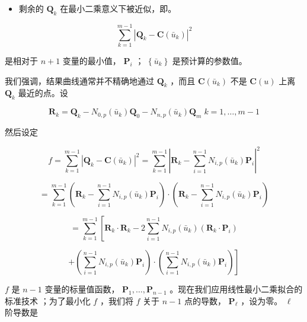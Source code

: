 \documentclass[../main.tex]{subfiles}
\begin{document}
\begin{itemize}
\item 剩余的 \({\mathbf{Q}}_{k}\) 在最小二乘意义下被近似，即。
\end{itemize}

\[
\mathop{\sum }\limits_{{k = 1}}^{{m - 1}}{\left| {\mathbf{Q}}_{k} - \mathbf{C}\left( {\bar{u}}_{k}\right) \right| }^{2} \tag{9.62}
\]

是相对于 \(n + 1\) 变量的最小值， \({\mathbf{P}}_{i}\) ； \(\left\{  {\bar{u}}_{k}\right\}\) 是预计算的参数值。

我们强调，结果曲线通常并不精确地通过 \({\mathbf{Q}}_{k}\) ，而且 \(\mathbf{C}\left( {\bar{u}}_{k}\right)\) 不是 \(\mathbf{C}\left( u\right)\) 上离 \({\mathbf{Q}}_{k}\) 最近的点。设

\[
{\mathbf{R}}_{k} = {\mathbf{Q}}_{k} - {N}_{0,p}\left( {\bar{u}}_{k}\right) {\mathbf{Q}}_{0} - {N}_{n,p}\left( {\bar{u}}_{k}\right) {\mathbf{Q}}_{m}\;k = 1,\ldots ,m - 1 \tag{9.63}
\]

然后设定

\[
f = \mathop{\sum }\limits_{{k = 1}}^{{m - 1}}{\left| {\mathbf{Q}}_{k} - \mathbf{C}\left( {\bar{u}}_{k}\right) \right| }^{2} = \mathop{\sum }\limits_{{k = 1}}^{{m - 1}}{\left| {\mathbf{R}}_{k} - \mathop{\sum }\limits_{{i = 1}}^{{n - 1}}{N}_{i,p}\left( {\bar{u}}_{k}\right) {\mathbf{P}}_{i}\right| }^{2}
\]

\[
= \mathop{\sum }\limits_{{k = 1}}^{{m - 1}}\left( {{\mathbf{R}}_{k} - \mathop{\sum }\limits_{{i = 1}}^{{n - 1}}{N}_{i,p}\left( {\bar{u}}_{k}\right) {\mathbf{P}}_{i}}\right)  \cdot  \left( {{\mathbf{R}}_{k} - \mathop{\sum }\limits_{{i = 1}}^{{n - 1}}{N}_{i,p}\left( {\bar{u}}_{k}\right) {\mathbf{P}}_{i}}\right)
\]

\[
= \mathop{\sum }\limits_{{k = 1}}^{{m - 1}}\left\lbrack  {{\mathbf{R}}_{k} \cdot  {\mathbf{R}}_{k} - 2\mathop{\sum }\limits_{{i = 1}}^{{n - 1}}{N}_{i,p}\left( {\bar{u}}_{k}\right) \left( {{\mathbf{R}}_{k} \cdot  {\mathbf{P}}_{i}}\right) }\right.
\]

\[
\left. {+\left( {\mathop{\sum }\limits_{{i = 1}}^{{n - 1}}{N}_{i,p}\left( {\bar{u}}_{k}\right) {\mathbf{P}}_{i}}\right)  \cdot  \left( {\mathop{\sum }\limits_{{i = 1}}^{{n - 1}}{N}_{i,p}\left( {\bar{u}}_{k}\right) {\mathbf{P}}_{i}}\right) }\right\rbrack
\]

\(f\) 是 \(n - 1\) 变量的标量值函数， \({\mathbf{P}}_{1},\ldots ,{\mathbf{P}}_{n - 1}\) 。现在我们应用线性最小二乘拟合的标准技术 \cite{DeBo78,Vand83,Lanc86}；为了最小化 \(f\) ，我们将 \(f\) 关于 \(n - 1\) 点的导数， \({\mathbf{P}}_{\ell }\) ，设为零。 \(\ell\) 阶导数是
\end{document}
